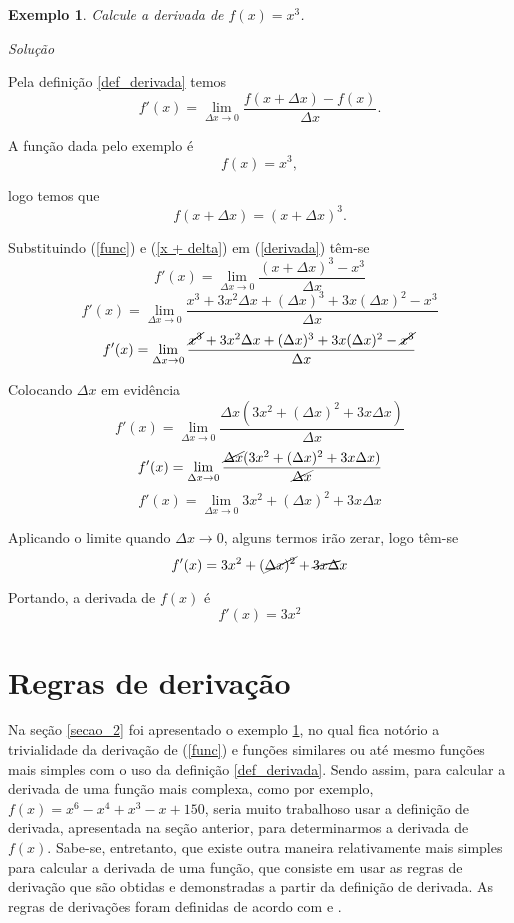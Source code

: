 \documentclass[
	12pt,				%
	openright,			%
    twoside,			%
	a4paper,			%
	chapter=TITLE,		%
	english,			%
	french,				%
	spanish,			%
	brazil				%
	]{abntex2}
\makeatletter
\newtheorem{exemplo}{Exemplo}
\renewenvironment{proof}[1][\proofname]{
	\par\pushQED{\qed}%
	\normalfont \topsep6\p@\@plus6\p@\relax
	\trivlist
	\item\relax
		{\itshape
			#1\@addpunct{.}}\hspace\labelsep\ignorespaces
}{%
	\popQED\endtrivlist\@endpefalse
}
\newenvironment{solution}{
	\begin{proof}[Solução]
}{%
	\end{proof}
}
\numberwithin{lema}{chapter}
\numberwithin{teorema}{chapter}
\numberwithin{definicao}{chapter}
\numberwithin{exemplo}{chapter}
\numberwithin{figure}{chapter}
\makeatother
\begin{document}
\begin{exemplo}
	\label{exemplo_01}
	Calcule a derivada de $f(x) = x^{3}$. 
\end{exemplo}
\begin{solution}
	Pela definição \ref{def_derivada} temos	
	\begin{equation}
		\label{derivada}
		f'(x) = \lim_{\Delta x\rightarrow 0} \frac{f(x + \Delta x) - f(x)}{\Delta x}.
	\end{equation}
	
	A função dada pelo exemplo é 	
	\begin{equation}
		\label{func}
		f(x) = x^{3}, 
	\end{equation}

	logo temos que	
	\begin{equation}
		\label{x + delta}
		f(x + \Delta x) = (x + \Delta x)^{3}.
	\end{equation}
	
	Substituindo (\ref{func}) e (\ref{x + delta}) em (\ref{derivada}) têm-se
	$$f'(x) = \lim_{\Delta x\rightarrow 0} \frac{(x + \Delta x)^{3} - x^{3}}{\Delta x}$$	
	$$f'(x) = \lim_{\Delta x\rightarrow 0} \frac{x^{3} +3x^{2}\Delta x + (\Delta x)^{3} + 3x(\Delta x)^{2} - x^{3}}{\Delta x}$$	
	$$f'(x) = \lim_{\Delta x\rightarrow 0} \frac{\cancel{x^{3}} +3x^{2}\Delta x + (\Delta x)^{3} + 3x(\Delta x)^{2} - \cancel{x^{3}}}{\Delta x}$$
	
	Colocando $\Delta x$ em evidência	
	$$f'(x) = \lim_{\Delta x\rightarrow 0} \frac{\Delta x(3x^{2} + (\Delta x)^{2} + 3x\Delta x)}{\Delta x}$$	
	$$f'(x) = \lim_{\Delta x\rightarrow 0} \frac{\cancel{\Delta x}(3x^{2} + (\Delta x)^{2} + 3x\Delta x)}{\cancel{\Delta x}}$$
	$$f'(x) = \lim_{\Delta x\rightarrow 0} 3x^{2} + (\Delta x)^{2} + 3x\Delta x$$
	
	Aplicando o limite quando $\Delta x \rightarrow 0$, alguns termos irão zerar, logo têm-se
	$$f'(x) = 3x^{2} + (\cancel{\Delta x)^{2}} + \cancel{3x\Delta} x$$
	
	Portando, a derivada de $f(x)$ é	
	$$f'(x) = 3x^{2}$$	
			
\end{solution}

\section{Regras de derivação}
\label{secao_3}

Na seção \ref{secao_2} foi apresentado o exemplo \ref{exemplo_01}, no qual fica notório a trivialidade da derivação de (\ref{func}) e funções similares ou até mesmo funções mais simples com o uso da definição \ref{def_derivada}. Sendo assim, para calcular a derivada de uma função mais complexa, como por exemplo, $f(x) = x^{6} - x^{4} + x^{3} - x + 150$, seria muito trabalhoso usar a definição de derivada, apresentada na seção anterior, para determinarmos a derivada de $f(x)$. Sabe-se, entretanto, que existe outra maneira relativamente mais simples para calcular a derivada de uma função, que consiste em usar as regras de derivação que são obtidas e demonstradas a partir da definição de derivada. As regras de derivações foram definidas de acordo com  e .
\end{document}
